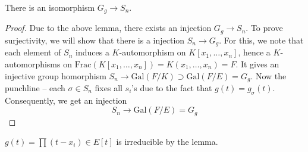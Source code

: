 \vspace{2ex}
\begin{prop}
There is an isomorphism $G_{g}\rightarrow S_{n}$.
\end{prop}
\vspace{2ex}
\begin{proof}
Due to the above lemma, there exists an injection $G_{g}\rightarrow S_{n}$. To prove surjectivity, we will show that there is a injection $S_{n}\rightarrow G_{g}$. For this, we note that each element of $S_{n}$ induces a $K$-automorphism on $K[x_1,\ldots ,x_{n}]$, hence a $K$-automorphisms on $\mathrm{Frac}(K[x_1,\ldots ,x_{n}])=K(x_1,\ldots ,x_{n})=F$. It gives an injective group homorphism $S_{n}\rightarrow \mathrm{Gal}(F/K) \supset \mathrm{Gal}(F/E)=G_{g}$. Now the punchline -- each $\sigma \in S_{n}$ fixes all $s_{i}$'s due to the fact that $g(t)=g_{\sigma }(t)$. Consequently, we get an injection 
\[S_{n}\rightarrow \mathrm{Gal}(F/E)=G_{g}\]
\end{proof}
\vspace{2ex}
\begin{rmk}
$g(t)=\prod (t-x_{i})\in E[t]$ is irreducible by the lemma.
\end{rmk}
\vspace{2ex}

